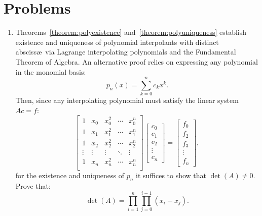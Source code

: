 \section{Problems}
\begin{enumerate}
\item Theorems~\ref{theorem:polyexistence} and~\ref{theorem:polyuniqueness} establish existence and uniqueness of polynomial interpolants with distinct absciss\ae~via Lagrange interpolating polynomials and the Fundamental Theorem of Algebra. An alternative proof relies on expressing any polynomial in the monomial basis:
\[
p_n(x) = \sum_{k=0}^n c_k x^k.
\]
Then, since any interpolating polynomial must satisfy the linear system $Ac = f$:
\begin{equation}\label{eq:Aceqf}
\begin{bmatrix}
1 & x_0 & x_0^2 & \cdots & x_0^n\\
1 & x_1 & x_1^2 & \cdots & x_1^n\\
1 & x_2 & x_2^2 & \cdots & x_2^n\\
\vdots & \vdots & \vdots & \ddots & \vdots\\
1 & x_n & x_n^2 & \cdots & x_n^n\\
\end{bmatrix}
\begin{bmatrix}
c_0\\c_1\\c_2\\\vdots\\c_n
\end{bmatrix}
=
\begin{bmatrix}
f_0\\f_2\\f_3\\\vdots\\f_n
\end{bmatrix},
\end{equation}
for the existence and uniqueness of $p_n$ it suffices to show that $\det(A)\ne0$. Prove that:
\[
\det(A) = \prod_{i=1}^n\prod_{j=0}^{i-1} (x_i-x_j).
\]


\end{enumerate}
